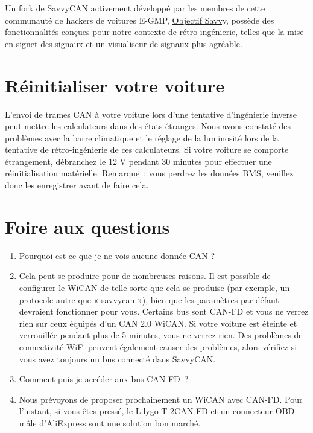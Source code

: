 \documentclass[superscriptaddress,onecolumn,floatfix]{revtex4-2}
\begin{document}
Un fork de SavvyCAN activement développé par les membres de cette communauté de hackers de voitures E-GMP, \href{https://github.com/SuperSuave/SavvyLens}{Objectif Savvy}, possède des fonctionnalités conçues pour notre contexte de rétro-ingénierie, telles que la mise en signet des signaux et un visualiseur de signaux plus agréable.

\section{Réinitialiser votre voiture}

L'envoi de trames CAN à votre voiture lors d'une tentative d'ingénierie inverse peut mettre les calculateurs dans des états étranges. Nous avons constaté des problèmes avec la barre climatique et le réglage de la luminosité lors de la tentative de rétro-ingénierie de ces calculateurs. Si votre voiture se comporte étrangement, débranchez le 12 V pendant 30 minutes pour effectuer une réinitialisation matérielle. Remarque : vous perdrez les données BMS, veuillez donc les enregistrer avant de faire cela.

\section{Foire aux questions}
\begin{enumerate}
  \item[Question :] Pourquoi est-ce que je ne vois aucune donnée CAN ?
  \item[UN:] Cela peut se produire pour de nombreuses raisons. Il est possible de configurer le WiCAN de telle sorte que cela se produise (par exemple, un protocole autre que « savvycan »), bien que les paramètres par défaut devraient fonctionner pour vous. Certains bus sont CAN-FD et vous ne verrez rien sur ceux équipés d'un CAN 2.0 WiCAN. Si votre voiture est éteinte et verrouillée pendant plus de 5 minutes, vous ne verrez rien. Des problèmes de connectivité WiFi peuvent également causer des problèmes, alors vérifiez si vous avez toujours un bus connecté dans SavvyCAN.
  \item[Question :] Comment puis-je accéder aux bus CAN-FD ?
  \item[UN:] Nous prévoyons de proposer prochainement un WiCAN avec CAN-FD. Pour l'instant, si vous êtes pressé, le Lilygo T-2CAN-FD et un connecteur OBD mâle d'AliExpress sont une solution bon marché.
\end{enumerate}
\appendix 

{}
\end{document}
